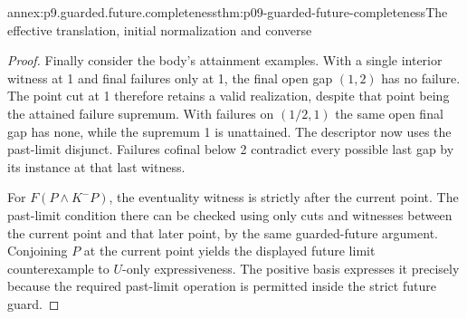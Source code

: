 \begin{annexitem}{annex:p9.guarded.future.completeness}{thm:p09-guarded-future-completeness}{The effective translation, initial normalization and converse}
\begin{proof}
Finally consider
the body's
attainment
examples. With
a single
interior witness
at 1 and
final failures
only at 1,
the final
open gap
\((1,2)\)
has no
failure.
The point
cut at 1
therefore
retains a
valid realization,
despite that
point being
the attained
failure supremum.
With failures
on \((1/2,1)\)
the same
open final
gap has
none, while
the supremum
1 is
unattained.
The descriptor
now uses
the past-limit
disjunct.
Failures
cofinal below
2 contradict
every possible
last gap
by its
instance at
that last
witness.

For \(F(P\land K^-P)\),
the eventuality
witness is
strictly after
the current
point. The
past-limit
condition there
can be checked
using only
cuts and
witnesses between
the current
point and
that later
point, by
the same
guarded-future
argument.
Conjoining \(P\)
at the current
point yields
the displayed
future limit
counterexample
to \(U\)-only
expressiveness.
The positive
basis expresses
it precisely
because the
required
past-limit
operation is
permitted
inside the
strict future
guard.
\end{proof}
\end{annexitem}
